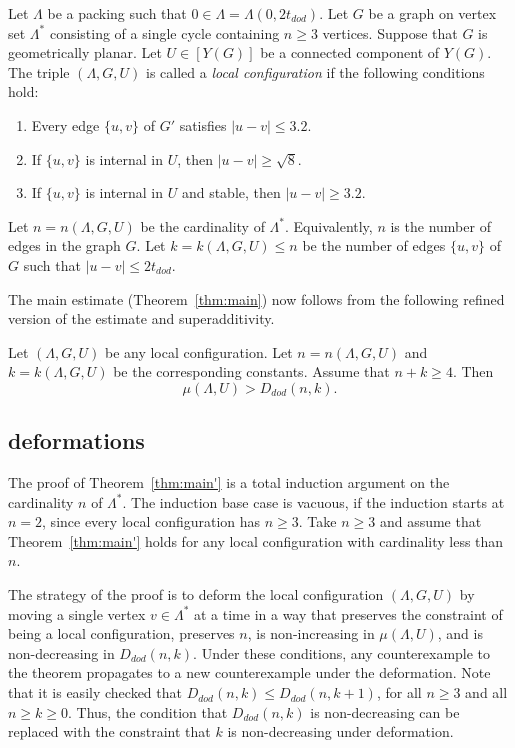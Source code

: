 \begin{definition}
Let $\Lambda$ be a packing such that $0\in\Lambda=\Lambda(0,2t_{dod})$.  
Let $G$ be a graph on vertex set $\Lambda^*$ 
consisting
of a single cycle containing $n\ge 3$ vertices.  
Suppose that $G$ is geometrically planar. 
Let $U\in [Y(G)]$ be a connected component of $Y(G)$.  
The triple $(\Lambda,G,U)$ is called a {\it local configuration} if the
following conditions hold:
\begin{enumerate}
\item Every edge $\{u,v\}$ of $G'$ satisfies $|u-v|\le 3.2$.
\item If
$\{u,v\}$ is internal in  $U$, then $|u-v|\ge \sqrt8$.
\item If $\{u,v\}$ is internal in $U$ and stable,
then $|u-v|\ge 3.2$.
\end{enumerate}
\end{definition}


Let $n=n(\Lambda,G,U)$ be the cardinality of $\Lambda^*$.  Equivalently,
$n$ is the number of edges in the graph $G$.  Let
$k=k(\Lambda,G,U)\le n$ be the number of edges $\{u,v\}$ of $G$ such
that $|u-v|\le 2t_{dod}$. 

The main estimate (Theorem~\ref{thm:main}) now follows from the following
refined version of the estimate and superadditivity.

\begin{theorem}\label{thm:main'}  
Let $(\Lambda,G,U)$ be any local configuration.
Let $n=n(\Lambda,G,U)$ and $k=k(\Lambda,G,U)$ be the corresponding constants.
Assume that $n+k\ge 4$.  Then
   $$
   \mu(\Lambda,U) > D_{dod}(n,k).
   $$
\end{theorem}

\subsection{deformations}


The proof of Theorem~\ref{thm:main'} is a total induction argument
on  the cardinality $n$ of $\Lambda^*$.  The induction base case
is vacuous, if the induction starts at $n=2$, since every
local configuration has $n\ge 3$.
Take $n\ge 3$ and assume that
Theorem~\ref{thm:main'} holds for any local configuration with
cardinality less than $n$.  

The strategy of the proof is to deform the local configuration $(\Lambda,G,U)$ by moving a single vertex $v\in\Lambda^*$ at a time in a way
that preserves the constraint of being a local configuration,
preserves $n$, 
is non-increasing in $\mu(\Lambda,U)$, 
and is non-decreasing in $D_{dod}(n,k)$.
Under these conditions, any counterexample to the theorem propagates 
to a new counterexample under the deformation.
Note that it is easily checked that $D_{dod}(n,k) \le D_{dod}(n,k+1)$, for all
$n\ge 3$ and all $n\ge k\ge0$.  Thus, the condition that $D_{dod}(n,k)$
is non-decreasing can be replaced with the constraint that $k$
is non-decreasing under deformation.

